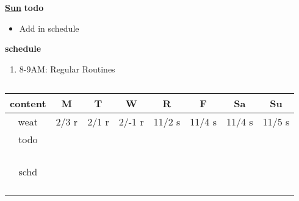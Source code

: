 \begin{columns}
          \begin{column}{0.15\textwidth}{\small \underline{\bf Sun}}
            {\small {\bf todo}}\\ 
            \begin{itemize}
              \tiny \item \tiny Add in schedule
            \end{itemize} 
                {\small {\bf schedule}}\\
                \begin{enumerate} 
                  \tiny \item \tiny 8-9AM: Regular Routines 
                \end{enumerate}
          \end{column}
        \end{columns}

      \else




\begin{table}[ht!]
\label{fig:calendar} 
\begin{center}
\begin{tabular}
{ | c || c | c | c | c | c | c | c |}
\hline
  \textbf{\small content} & {\small \bf M} & {\small \bf T} & {\small \bf W} & {\small \bf R} & {\small \bf F} & {\small \bf Sa} & {\small \bf Su} \\
  \hline
  \small weat  &\tiny 2/3 r &\tiny 2/1 r &\tiny 2/-1 r &\tiny 11/2 s  &\tiny 11/4 s   &\tiny  11/4 s &\tiny 11/5 s \\
  \hline
  \small todo  &\small &\small &\small &\small &\small &\small  &\small  \\
  \small       &\small &\small &\small &\small &\small &\small  &\small  \\
  \small       &\small &\small &\small &\small &\small &\small  &\small  \\
  \small       &\small &\small &\small &\small &\small &\small  &\small  \\
  \small       &\small &\small &\small &\small &\small &\small  &\small  \\
  \hline
  \small schd  &\small &\small &\small &\small &\small &\small  &\small  \\
  \small     &\small &\small &\small &\small &\small &\small  &\small  \\
  \small      &\small &\small &\small &\small &\small &\small  &\small  \\
  \small    &\small &\small &\small &\small &\small &\small  &\small  \\
  \small     &\small &\small &\small &\small &\small &\small &\small  \\
  \hline
\end{tabular}
\end{center}
\end{table} 


